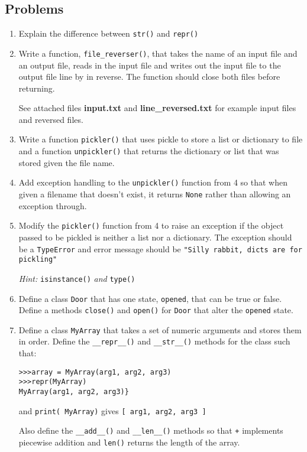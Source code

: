\documentclass{report}
\begin{document}
\subsection{Problems}
\begin{enumerate}
	\item Explain the difference between \verb|str()| and \verb|repr()|
	\item Write a function, \verb|file_reverser()|, that takes the name of an input file and an output file, reads in the input file and writes out the input file to the output file line by in reverse. The function should close both files before returning.

See attached files \textbf{input.txt} and \textbf{line\_reversed.txt} for example input files and reversed files.
	\item Write a function \verb|pickler()| that uses pickle to store a list or dictionary to file and a function \verb|unpickler()| that returns the dictionary or list that was stored given the file name.
	\item Add exception handling to the \verb|unpickler()| function from 4 so that when given a filename that doesn't exist, it returns \verb|None| rather than allowing an exception through.
	\item Modify the \verb|pickler()| function from 4 to raise an exception if the object passed to be pickled is neither a list nor a dictionary. The exception should be a \verb|TypeError| and error message should be \verb|"Silly rabbit, dicts are for pickling"|

\emph{Hint: }\verb|isinstance()| \emph{and} \verb|type()|

	\item Define a class \verb|Door| that has one state, \verb|opened|, that can be true or false. Define a methods \verb|close()| and \verb|open()| for \verb|Door| that alter the \verb|opened| state. 
	\item Define a class \verb|MyArray| that takes a set of numeric arguments and stores them in order. Define the \verb|__repr__()| and \verb|__str__()| methods for the class such that:

\begin{verbatim}
>>>array = MyArray(arg1, arg2, arg3)
>>>repr(MyArray)
MyArray(arg1, arg2, arg3)}
\end{verbatim}

and \verb|print( MyArray)| gives
\verb|[ arg1, arg2, arg3 ]|

Also define the \verb|__add__()| and \verb|__len__()| methods so that \verb|+| implements piecewise addition and \verb|len()| returns the length of the array.


\end{enumerate}
\end{document}
